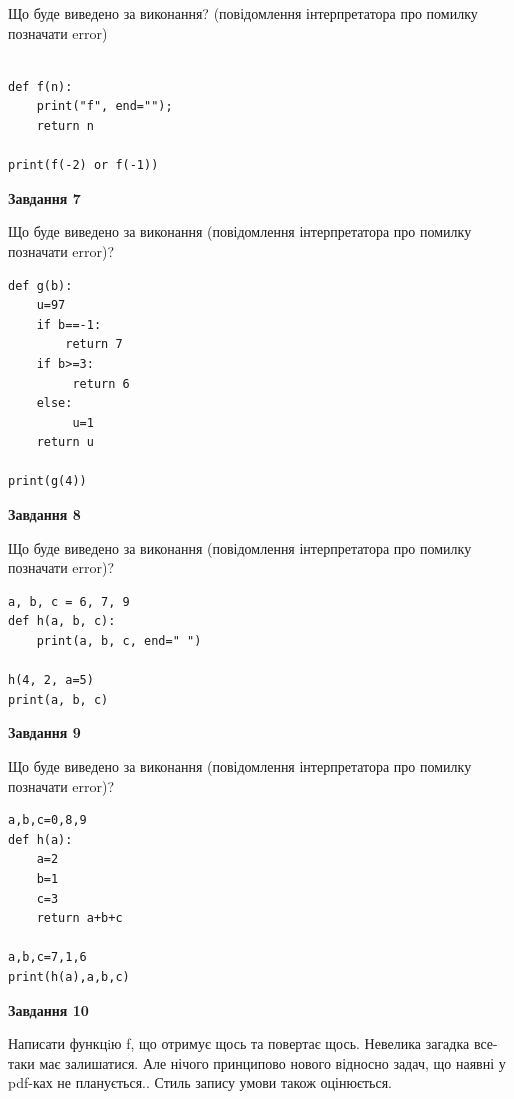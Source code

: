 \documentclass[12pt, ukrainian]{article}
\begin{document}
{\begin {large}
Що буде виведено за виконання? (повідомлення інтерпретатора про помилку позначати error)\par
\begin{verbatim}

def f(n):
    print("f", end="");
    return n

print(f(-2) or f(-1))
\end{verbatim}

{\begin {center}\textbf{Завдання 7}\end {center}}

Що буде виведено за виконання (повідомлення інтерпретатора про помилку позначати error)?\par
\begin{verbatim}
def g(b):
    u=97
    if b==-1: 
        return 7
    if b>=3:
         return 6
    else:
         u=1
    return u

print(g(4))
\end{verbatim}

{\begin {center}\textbf{Завдання 8}\end {center}}

Що буде виведено за виконання (повідомлення інтерпретатора про помилку позначати error)?\par
\begin{verbatim}
a, b, c = 6, 7, 9
def h(a, b, c):
    print(a, b, c, end=" ")

h(4, 2, a=5)
print(a, b, c)
\end{verbatim}

{\begin {center}\textbf{Завдання 9}\end {center}}

Що буде виведено за виконання (повідомлення інтерпретатора про помилку позначати error)?\par
\begin{verbatim}
a,b,c=0,8,9
def h(a):
    a=2
    b=1
    c=3
    return a+b+c

a,b,c=7,1,6
print(h(a),a,b,c)
\end{verbatim}

{\begin {center}\textbf{Завдання 10}\end {center}}


Написати функцiю f, що отримує щось та повертає щось. Невелика загадка все-таки має залишатися. Але нічого принципово нового відносно задач, що наявні у pdf-ках не планується.. Стиль запису умови також оцінюється.\par
\end {large}}
\newpage
\end{document}
